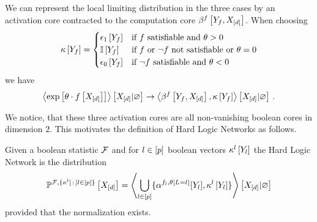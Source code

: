 
We can represent the local limiting distribution in the three cases by an activation core contracted to the computation core $\beta^{f}\left[Y_{f},X_{[d]}\right]$.
When choosing
\begin{align*}
	\kappa\left[Y_{f}\right] =
	\begin{cases}
		\epsilon_1\left[Y_{f}\right] & \text{if $f$ satisfiable and } \theta>0\\
		\mathbb{I}\left[Y_{f}\right] & \text{if $f$ or $\lnot f$ not satisfiable or } \theta=0 \\
		\epsilon_0\left[Y_{f}\right] & \text{if $\lnot f$ satisfiable and } \theta<0\\
	\end{cases}
\end{align*}
we have
\begin{align*}
	\left\langle \mathrm{exp}\left[\theta\cdot f\left[X_{[d]}\right]\right]\right\rangle \left[ X_{[d]} | \varnothing \right] \rightarrow
	\left\langle \beta^{f}\left[Y_{f},X_{[d]}\right],\kappa\left[Y_{f}\right]\right\rangle \left[ X_{[d]} | \varnothing \right] \, .
\end{align*}

We notice, that these three activation cores are all non-vanishing boolean cores in dimension $2$.
This motivates the definition of Hard Logic Networks as follows.

\begin{definition}\label{def:hardLogicNetwork}
	Given a boolean statistic $\mathcal{F}$ and for $l\in[p]$ boolean vectors $\kappa^{l}\left[Y_{l}\right]$ the Hard Logic Network is the distribution
	\begin{align*}
		\mathbb{P}^{\mathcal{F},\{\kappa^{l}\left[\,:\,\right]l\in[p]\}}\left[X_{[d]}\right]
		= \left\langle 
			\bigcup_{l\in[p]}\{\alpha^{f_{l},\theta\left[L_{}=l_{}\right]}[Y_{l}],\kappa^{l}\left[Y_{l}\right]\}
		\right\rangle \left[ X_{[d]} | \varnothing \right]
	\end{align*}
	provided that the normalization exists.
\end{definition}

